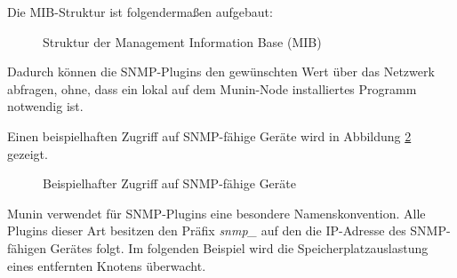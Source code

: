 Die MIB-Struktur ist folgendermaßen aufgebaut:

\begin{figure}[ht]
	\centering
		\caption[Struktur der Management Information Base (MIB)]{Struktur der Management Information Base (MIB)\protect\footnotemark}
		\label{munin-mib}
\end{figure}
Dadurch können die SNMP-Plugins den gewünschten Wert über das Netzwerk abfragen, ohne, dass ein lokal auf dem Munin-Node installiertes Programm notwendig ist.

\newpage

Einen beispielhaften Zugriff auf SNMP-fähige Geräte wird in Abbildung \ref{munin-snmp} gezeigt.

\begin{figure}[ht]
	\centering
		\caption[Beispielhafter Zugriff auf SNMP-fähige Geräte]{Beispielhafter Zugriff auf SNMP-fähige Geräte\protect\footnotemark}
		\label{munin-snmp}
\end{figure}

Munin verwendet für SNMP-Plugins eine besondere Namenskonvention.
Alle Plugins dieser Art besitzen den Präfix \textit{snmp\_} auf den die IP-Adresse des SNMP-fähigen Gerätes folgt.
Im folgenden Beispiel wird die Speicherplatzauslastung eines entfernten Knotens überwacht.

